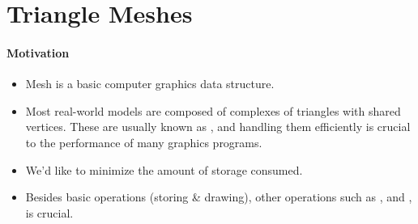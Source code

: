 \documentclass[11pt]{article}
\numberwithin{equation}{section}
\begin{document}
\section{Triangle Meshes}
\paragraph{Motivation} 
\begin{itemize}
	\item Mesh is a basic computer graphics data structure.
	\item Most real-world models are composed of complexes of triangles with shared vertices. These are usually known as , and handling them efficiently is crucial to the performance of many graphics programs. 
	\item We'd like to minimize the amount of storage consumed.
	\item Besides basic operations (storing \& drawing), other operations such as ,  and ,  is crucial.
\end{itemize}
\end{document}

